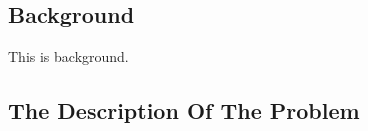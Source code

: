 \documentclass[../main]{subfiles}
\begin{document}
\subsection{Background}
    This is background.

    
\subsection{The Description Of The Problem}
\end{document}
